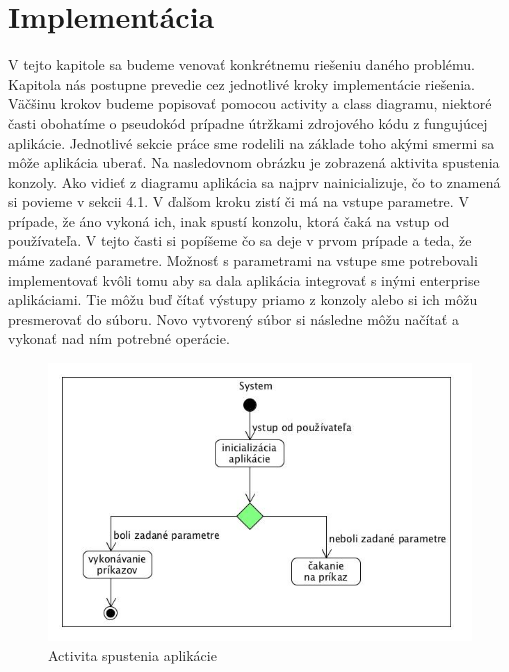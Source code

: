 \section{Implementácia}
\indent V tejto kapitole sa budeme venovať konkrétnemu riešeniu daného problému. Kapitola nás postupne prevedie cez jednotlivé kroky implementácie riešenia. Väčšinu krokov budeme popisovať pomocou activity a class diagramu, niektoré časti obohatíme o pseudokód prípadne útržkami zdrojového kódu z fungujúcej aplikácie. Jednotlivé sekcie práce sme rodelili na základe toho akými smermi sa môže aplikácia uberať. Na nasledovnom obrázku je zobrazená aktivita spustenia konzoly. Ako vidieť z diagramu aplikácia sa najprv nainicializuje, čo to znamená si povieme v sekcii 4.1. V ďalšom kroku zistí či má na vstupe parametre. V prípade, že áno vykoná ich, inak spustí konzolu, ktorá čaká na vstup od používateľa. V tejto časti si popíšeme čo sa deje v prvom prípade a teda, že máme zadané parametre. 
\newline 
\indent Možnosť s parametrami na vstupe sme potrebovali implementovať kvôli tomu aby sa dala aplikácia integrovať s inými enterprise aplikáciami. Tie môžu buď čítať výstupy priamo z konzoly alebo si ich môžu presmerovať do súboru. Novo vytvorený súbor si následne môžu načítať a vykonať nad ním potrebné operácie.
\begin{figure}[!htbp]
	\centering
	\includegraphics[width=\linewidth]{img/System.jpg}
	\caption{Activita spustenia aplikácie}
	\label{fig:test}
\end{figure}
